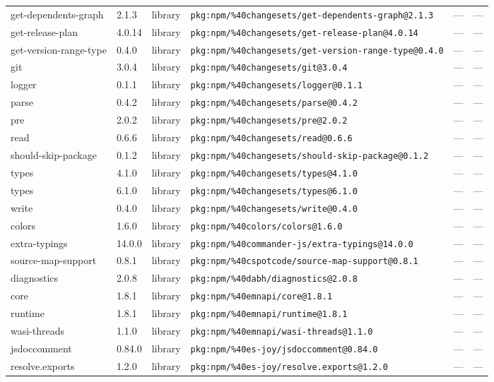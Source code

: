 \documentclass[11pt]{article}
\begin{document}
\begin{longtable}{|l|l|l|p{2.2cm}|l|p{4cm}|}
get-dependents-graph & 2.1.3 & library & \texttt{pkg:npm/\%40changesets/get-dependents-graph@2.1.3} & — & — \\
get-release-plan & 4.0.14 & library & \texttt{pkg:npm/\%40changesets/get-release-plan@4.0.14} & — & — \\
get-version-range-type & 0.4.0 & library & \texttt{pkg:npm/\%40changesets/get-version-range-type@0.4.0} & — & — \\
git & 3.0.4 & library & \texttt{pkg:npm/\%40changesets/git@3.0.4} & — & — \\
logger & 0.1.1 & library & \texttt{pkg:npm/\%40changesets/logger@0.1.1} & — & — \\
parse & 0.4.2 & library & \texttt{pkg:npm/\%40changesets/parse@0.4.2} & — & — \\
pre & 2.0.2 & library & \texttt{pkg:npm/\%40changesets/pre@2.0.2} & — & — \\
read & 0.6.6 & library & \texttt{pkg:npm/\%40changesets/read@0.6.6} & — & — \\
should-skip-package & 0.1.2 & library & \texttt{pkg:npm/\%40changesets/should-skip-package@0.1.2} & — & — \\
types & 4.1.0 & library & \texttt{pkg:npm/\%40changesets/types@4.1.0} & — & — \\
types & 6.1.0 & library & \texttt{pkg:npm/\%40changesets/types@6.1.0} & — & — \\
write & 0.4.0 & library & \texttt{pkg:npm/\%40changesets/write@0.4.0} & — & — \\
colors & 1.6.0 & library & \texttt{pkg:npm/\%40colors/colors@1.6.0} & — & — \\
extra-typings & 14.0.0 & library & \texttt{pkg:npm/\%40commander-js/extra-typings@14.0.0} & — & — \\
source-map-support & 0.8.1 & library & \texttt{pkg:npm/\%40cspotcode/source-map-support@0.8.1} & — & — \\
diagnostics & 2.0.8 & library & \texttt{pkg:npm/\%40dabh/diagnostics@2.0.8} & — & — \\
core & 1.8.1 & library & \texttt{pkg:npm/\%40emnapi/core@1.8.1} & — & — \\
runtime & 1.8.1 & library & \texttt{pkg:npm/\%40emnapi/runtime@1.8.1} & — & — \\
wasi-threads & 1.1.0 & library & \texttt{pkg:npm/\%40emnapi/wasi-threads@1.1.0} & — & — \\
jsdoccomment & 0.84.0 & library & \texttt{pkg:npm/\%40es-joy/jsdoccomment@0.84.0} & — & — \\
resolve.exports & 1.2.0 & library & \texttt{pkg:npm/\%40es-joy/resolve.exports@1.2.0} & — & — \\

\end{longtable}
\end{document}
